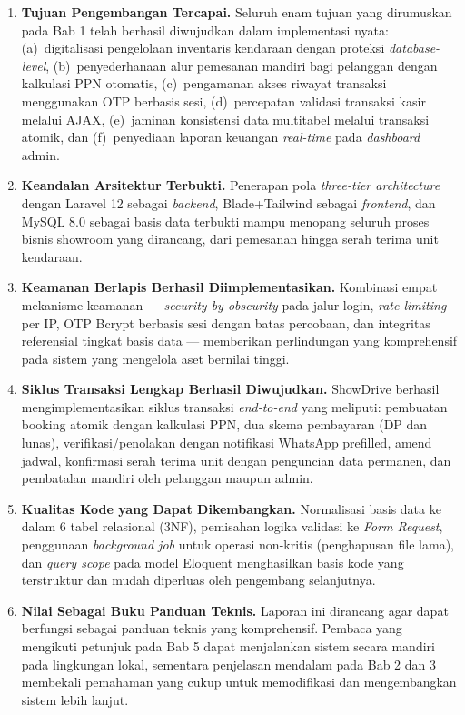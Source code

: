 \documentclass[11pt, a5paper]{article}
\begin{document}
\begin{enumerate}[label=\arabic*.]
  \item \textbf{Tujuan Pengembangan Tercapai.} Seluruh enam tujuan yang
        dirumuskan pada Bab 1 telah berhasil diwujudkan dalam implementasi nyata:
        (a)~digitalisasi pengelolaan inventaris kendaraan dengan proteksi
        \textit{database-level}, (b)~penyederhanaan alur pemesanan mandiri bagi
        pelanggan dengan kalkulasi PPN otomatis, (c)~pengamanan akses riwayat
        transaksi menggunakan OTP berbasis sesi, (d)~percepatan validasi transaksi
        kasir melalui AJAX, (e)~jaminan konsistensi data multitabel melalui
        transaksi atomik, dan (f)~penyediaan laporan keuangan \textit{real-time}
        pada \textit{dashboard} admin.

  \item \textbf{Keandalan Arsitektur Terbukti.} Penerapan pola \textit{three-tier
        architecture} dengan Laravel 12 sebagai \textit{backend}, Blade+Tailwind
        sebagai \textit{frontend}, dan MySQL 8.0 sebagai basis data terbukti
        mampu menopang seluruh proses bisnis showroom yang dirancang, dari
        pemesanan hingga serah terima unit kendaraan.

  \item \textbf{Keamanan Berlapis Berhasil Diimplementasikan.} Kombinasi empat
        mekanisme keamanan — \textit{security by obscurity} pada jalur login,
        \textit{rate limiting} per IP, OTP Bcrypt berbasis sesi dengan batas
        percobaan, dan integritas referensial tingkat basis data — memberikan
        perlindungan yang komprehensif pada sistem yang mengelola aset bernilai
        tinggi.

  \item \textbf{Siklus Transaksi Lengkap Berhasil Diwujudkan.} ShowDrive
        berhasil mengimplementasikan siklus transaksi \textit{end-to-end} yang
        meliputi: pembuatan booking atomik dengan kalkulasi PPN, dua skema
        pembayaran (DP dan lunas), verifikasi/penolakan dengan notifikasi
        WhatsApp prefilled, amend jadwal, konfirmasi serah terima unit dengan
        penguncian data permanen, dan pembatalan mandiri oleh pelanggan maupun
        admin.

  \item \textbf{Kualitas Kode yang Dapat Dikembangkan.} Normalisasi basis data
        ke dalam 6 tabel relasional (3NF), pemisahan logika validasi ke
        \textit{Form Request}, penggunaan \textit{background job} untuk operasi
        non-kritis (penghapusan file lama), dan \textit{query scope} pada model
        Eloquent menghasilkan basis kode yang terstruktur dan mudah diperluas
        oleh pengembang selanjutnya.

  \item \textbf{Nilai Sebagai Buku Panduan Teknis.} Laporan ini dirancang agar
        dapat berfungsi sebagai panduan teknis yang komprehensif. Pembaca yang
        mengikuti petunjuk pada Bab 5 dapat menjalankan sistem secara mandiri
        pada lingkungan lokal, sementara penjelasan mendalam pada Bab 2 dan 3
        membekali pemahaman yang cukup untuk memodifikasi dan mengembangkan
        sistem lebih lanjut.
\end{enumerate}
\end{document}
